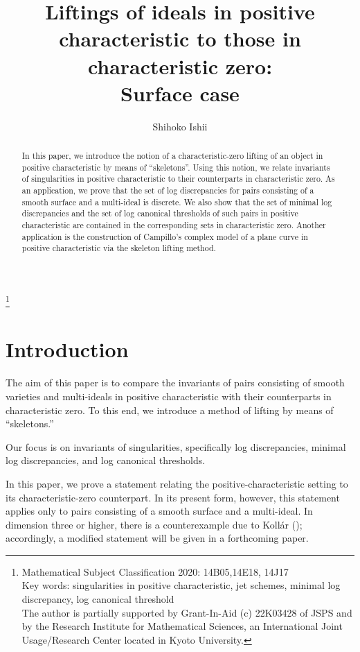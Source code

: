 \documentclass[a4paper]{amsart}
\theoremstyle{definition}
\begin{document}
     
\title[Liftings of ideals]{Liftings of ideals in positive characteristic to those in characteristic zero: \\
Surface case}


\thanks{Mathematical Subject Classification 2020: 14B05,14E18, 14J17\\
Key words: singularities in positive characteristic, jet schemes, minimal log discrepancy, log canonical threshold\\
The author is partially supported by Grant-In-Aid (c) 22K03428 of JSPS 
and  by the Research Institute for Mathematical Sciences, an International Joint Usage/Research Center located in Kyoto University.
 }

\author{Shihoko Ishii }

\begin{abstract}
In this paper, we introduce the notion of a characteristic-zero lifting of an object in positive characteristic by means of ``skeletons''.
 Using this notion, we relate invariants of singularities in positive characteristic to their counterparts in characteristic zero. As an application, we prove that the set of log discrepancies for pairs consisting of a smooth surface and a multi-ideal is discrete. 
 We also show that the set of minimal log discrepancies and the set of log canonical thresholds of such pairs in positive characteristic are contained in the corresponding sets in characteristic zero.
 Another application is the construction of Campillo's complex model of a plane curve in positive characteristic via the skeleton lifting method.
\end{abstract}

\maketitle
\section{Introduction}
%
\noindent
The aim of this paper is to compare the invariants of pairs consisting of smooth varieties and multi-ideals in positive characteristic with their counterparts in characteristic zero. To this end, we introduce a method of lifting by means of ``skeletons.''

Our focus is on invariants of singularities, specifically log discrepancies, minimal log discrepancies, and log canonical thresholds.

In this paper, we prove a statement relating the positive-characteristic setting to its characteristic-zero counterpart. In its present form, however, this statement applies only to pairs consisting of a smooth surface and a multi-ideal. In dimension three or higher, there is a counterexample due to Koll\'ar (\cite{ko}); accordingly, a modified statement will be given in a forthcoming paper.
\end{document}
